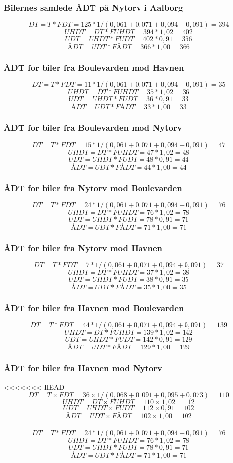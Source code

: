 \subsubsection{Bilernes samlede ÅDT på Nytorv i Aalborg}
$$DT = T * FDT = 125 * 1/(0,061+0,071+0,094+0,091) = 394$$
$$UHDT = DT * FUHDT = 394 * 1,02 = 402$$
$$UDT = UHDT * FUDT = 402 * 0,91 = 366$$
$$ÅDT = UDT * FÅDT = 366 * 1,00 = 366$$
\subsubsection{ÅDT for biler fra Boulevarden mod Havnen}
$$DT = T * FDT = 11 * 1/(0,061+0,071+0,094+0,091) = 35$$
$$UHDT = DT * FUHDT = 35 * 1,02 = 36$$
$$UDT = UHDT * FUDT = 36 * 0,91 = 33$$
$$ÅDT = UDT * FÅDT = 33 * 1,00 = 33$$
\subsubsection{ÅDT for biler fra Boulevarden mod Nytorv}
$$DT = T * FDT = 15 * 1/(0,061+0,071+0,094+0,091) = 47$$
$$UHDT = DT * FUHDT = 47 * 1,02 = 48$$
$$UDT = UHDT * FUDT = 48 * 0,91 = 44$$
$$ÅDT = UDT * FÅDT = 44 * 1,00 = 44$$
\subsubsection{ÅDT for biler fra Nytorv mod Boulevarden}
$$DT = T * FDT = 24 * 1/(0,061+0,071+0,094+0,091) = 76$$
$$UHDT = DT * FUHDT = 76 * 1,02 = 78$$
$$UDT = UHDT * FUDT = 78 * 0,91 = 71$$
$$ÅDT = UDT * FÅDT = 71 * 1,00 = 71$$
\subsubsection{ÅDT for biler fra Nytorv mod Havnen}
$$DT = T * FDT = 7 * 1/(0,061+0,071+0,094+0,091) = 37$$
$$UHDT = DT * FUHDT = 37 * 1,02 = 38$$
$$UDT = UHDT * FUDT = 38 * 0,91 = 35$$
$$ÅDT = UDT * FÅDT = 35 * 1,00 = 35$$
\subsubsection{ÅDT for biler fra Havnen mod Boulevarden}
$$DT = T * FDT = 44 * 1/(0,061+0,071+0,094+0,091) = 139$$
$$UHDT = DT * FUHDT = 139 * 1,02 = 142$$
$$UDT = UHDT * FUDT = 142 * 0,91 = 129$$
$$ÅDT = UDT * FÅDT = 129 * 1,00 = 129$$
\subsubsection{ÅDT for biler fra Havnen mod Nytorv}
<<<<<<< HEAD
$$DT = T \times FDT = 36 \times 1/(0,068+0,091+0,095+0,073) = 110$$
$$UHDT = DT \times FUHDT = 110 \times 1,02 = 112$$
$$UDT = UHDT \times FUDT = 112 \times 0,91 = 102$$
$$ÅDT = UDT \times FÅDT = 102 \times 1,00 = 102$$
=======
$$DT = T * FDT = 24 * 1/(0,061+0,071+0,094+0,091) = 76$$
$$UHDT = DT * FUHDT = 76 * 1,02 = 78$$
$$UDT = UHDT * FUDT = 78 * 0,91 = 71$$
$$ÅDT = UDT * FÅDT = 71 * 1,00 = 71$$

